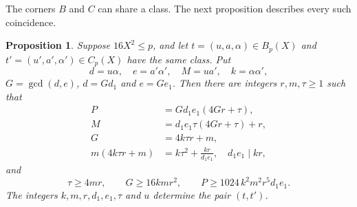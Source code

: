 \documentclass[aps,prd,twocolumn,superscriptaddress,nofootinbib,longbibliography,floatfix,showkeys,nobalancelastpage,amsmath,amssymb,10pt]{revtex4-2}
\theoremstyle{plain}
\newtheorem{proposition}[theorem]{Proposition}
\theoremstyle{definition}
\theoremstyle{plain}
\begin{document}
The corners $B$ and $C$ can share a class. The next proposition describes every such coincidence.

\begin{proposition}\label{prop:BC}
Suppose $16X^2\le p$, and let $t=(u,a,\alpha)\in B_p(X)$ and $t'=(u',a',\alpha')\in C_p(X)$ have the same class. Put
\[
d=u\alpha,\quad e=a'\alpha',\quad M=ua',\quad k=\alpha\alpha',
\]
$G=\gcd(d,e)$, $d=Gd_1$ and $e=Ge_1$. Then there are integers $r,m,\tau\ge1$ such that
\begin{align}
P&=Gd_1e_1(4Gr+\tau),\label{eq:BC-P}\\
M&=d_1e_1\tau(4Gr+\tau)+r,\label{eq:BC-M}\\
G&=4k\tau r+m,\label{eq:BC-G}\\
m(4k\tau r+m)&=k\tau^2+\frac{kr}{d_1e_1},\quad d_1e_1\mid kr,\label{eq:BC-quad}
\end{align}
and
\begin{equation}\label{eq:BC-bounds}
\tau\ge4mr,\qquad G\ge16kmr^2,\qquad P\ge1024\,k^2m^2r^5d_1e_1.
\end{equation}
The integers $k,m,r,d_1,e_1,\tau$ and $u$ determine the pair $(t,t')$.
\end{proposition}
\end{document}
